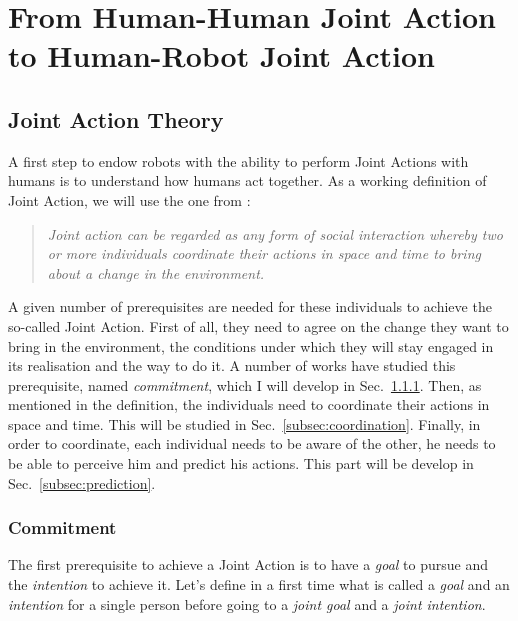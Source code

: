 \documentclass[english,a4paper,11pt,twoside]{StyleThese}
\begin{document}
\setcounter{chapter}{0} %
\dominitoc
\faketableofcontents
\fi

\chapter{From Human-Human Joint Action to Human-Robot Joint Action}
\minitoc

\section{Joint Action Theory}

A first step to endow robots with the ability to perform Joint Actions with humans is to understand how humans act together. As a working definition of Joint Action, we will use the one from \cite{sebanz2006joint}:

\begin{quote}
\textit{Joint action can be regarded as any form of social interaction whereby two or more individuals coordinate their actions in space and time to bring about a change in the environment.}
\end{quote}

A given number of prerequisites are needed for these individuals to achieve the so-called Joint Action. First of all, they need to agree on the change they want to bring in the environment, the conditions under which they will stay engaged in its realisation and the way to do it. A number of works have studied this prerequisite, named \textit{commitment}, which I will develop in Sec.~\ref{subsec:commitment}. Then, as mentioned in the definition, the individuals need to coordinate their actions in space and time. This will be studied in Sec.~\ref{subsec:coordination}. Finally, in order to coordinate, each individual needs to be aware of the other, he needs to be able to perceive him and predict his actions. This part will be develop in Sec.~\ref{subsec:prediction}.

\subsection{Commitment}

\label{subsec:commitment}

The first prerequisite to achieve a Joint Action is to have a \textit{goal} to pursue and the \textit{intention} to achieve it. Let's define in a first time what is called a \textit{goal} and an \textit{intention} for a single person before going to a \textit{joint goal} and a \textit{joint intention}.
\end{document}
